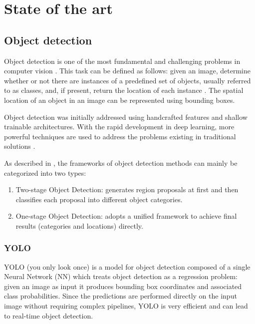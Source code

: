 \chapter{State of the art}
\label{chap:sota}

\section{Object detection}

Object detection is one of the most fundamental and challenging problems in computer vision \cite{zou2019object}. This task can be defined as follows: given an image, determine whether or not there are instances of a predefined set of objects, usually referred to as classes, and, if present, return the location of each instance \cite{liu2020deep}. The spatial location of an object in an image can be represented using bounding boxes.

Object detection was initially addressed using handcrafted features and shallow trainable architectures.
With the rapid development in deep learning, more powerful techniques are used to address the problems existing in traditional solutions \cite{zhao2019object}. 

As described in \cite{zhao2019object}, the frameworks of object detection methods can mainly be categorized into two types:
\begin{enumerate}
    \item Two-stage Object Detection: generates region proposals at first and then classifies each proposal into different object categories.
    \item One-stage Object Detection: adopts a unified framework to achieve final results (categories and locations) directly.
\end{enumerate} 

\subsection{YOLO}
\label{sec:yolo}
YOLO (you only look once) \cite{redmon2016you} is a model for object detection composed of a single Neural Network (NN) which treats object detection as a regression problem: given an image as input it produces bounding box coordinates and associated class probabilities. Since the predictions are performed directly on the input image without requiring complex pipelines, YOLO is very efficient and can lead to real-time object detection.

